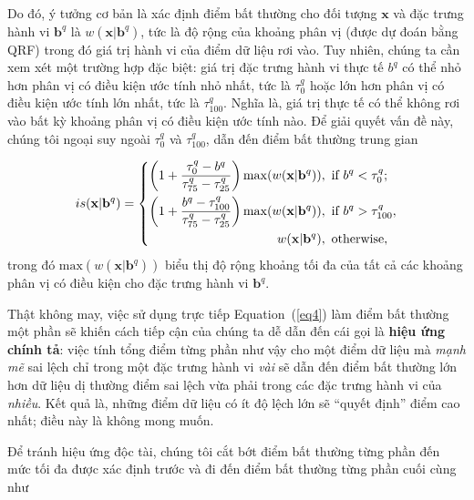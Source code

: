Do đó, ý tưởng cơ bản là xác định điểm bất thường cho đối tượng $\mathbf{x}$ và đặc trưng hành vi $\mathbf{b}^{q}$ là $w(\mathbf{x}\rvert\mathbf{b}^{q})$, tức là độ rộng của khoảng phân vị (được dự đoán bằng QRF) trong đó giá trị hành vi của điểm dữ liệu rơi vào. Tuy nhiên, chúng ta cần xem xét một trường hợp đặc biệt: giá trị đặc trưng hành vi thực tế $b^{q}$ có thể nhỏ hơn phân vị có điều kiện ước tính nhỏ nhất, tức là $\tau_{0}^{q}$ hoặc lớn hơn phân vị có điều kiện ước tính lớn nhất, tức là $\tau_{100}^{q}$. Nghĩa là, giá trị thực tế có thể không rơi vào bất kỳ khoảng phân vị có điều kiện ước tính nào. Để giải quyết vấn đề này, chúng tôi ngoại suy ngoài $\tau_{0}^{q}$ và $\tau_{100}^{q}$, dẫn đến điểm bất thường trung gian

\begin{equation}
\centering
is(\mathbf{x}\rvert\mathbf{b}^{q})=\left\{
\begin{aligned}\left(1+\frac{\tau_{0}^{q}-b^{q}}{\tau_{75}^{q}-\tau_{25}^{q}}\right)\mathrm{max}(w(\mathbf{x}\rvert\mathbf{b}^{q}))&, \text{ if } b^{q} < \tau_{0}^{q} ; \\
\left(1+\frac{b^{q}-\tau_{100}^{q}}{\tau_{75}^{q}-\tau_{25}^{q}}\right)\mathrm{max}(w(\mathbf{x}\rvert\mathbf{b}^{q}))&, \text{ if }  b^{q} > \tau_{100}^{q}, \\
w(\mathbf{x}\rvert\mathbf{b}^{q})&, \text{ otherwise},\\
\end{aligned}
\right.
\label{eq4}
\end{equation}
trong đó $\mathrm{max}(w(\mathbf{x}\rvert\mathbf{b}^{q}))$ biểu thị độ rộng khoảng tối đa của tất cả các khoảng phân vị có điều kiện cho đặc trưng hành vi $\textbf{b}^{q}$.

Thật không may, việc sử dụng trực tiếp Equation~(\ref{eq4}) làm điểm bất thường một phần sẽ khiến cách tiếp cận của chúng ta dễ dẫn đến cái gọi là \textbf{hiệu ứng chính tả}: việc tính tổng điểm từng phần như vậy cho một điểm dữ liệu mà \emph{mạnh mẽ} sai lệch chỉ trong một đặc trưng hành vi \emph{vài} sẽ dẫn đến điểm bất thường lớn hơn dữ liệu dị thường điểm sai lệch vừa phải trong các đặc trưng hành vi của \emph{nhiều}. Kết quả là, những điểm dữ liệu có ít độ lệch lớn sẽ “quyết định” điểm cao nhất; điều này là không mong muốn.

Để tránh hiệu ứng độc tài, chúng tôi cắt bớt điểm bất thường từng phần đến mức tối đa được xác định trước và đi đến điểm bất thường từng phần cuối cùng như

